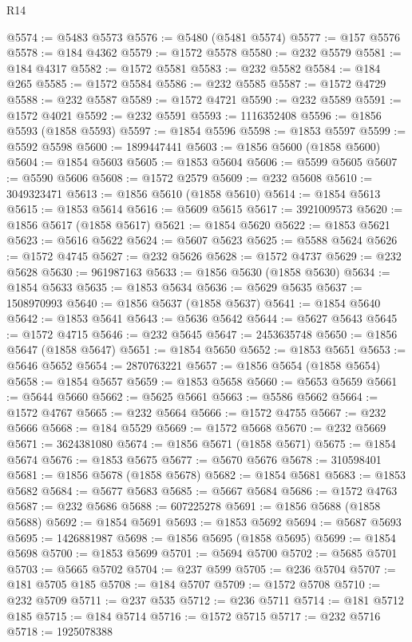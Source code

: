 \begin{lexlean}{R14}
\begin{coremodule}
@5574 := @5483 @5573
@5576 := @5480 (@5481 @5574)
@5577 := @157 @5576
@5578 := @184 @4362
@5579 := @1572 @5578
@5580 := @232 @5579
@5581 := @184 @4317
@5582 := @1572 @5581
@5583 := @232 @5582
@5584 := @184 @265
@5585 := @1572 @5584
@5586 := @232 @5585
@5587 := @1572 @4729
@5588 := @232 @5587
@5589 := @1572 @4721
@5590 := @232 @5589
@5591 := @1572 @4021
@5592 := @232 @5591
@5593 := 1116352408
@5596 := @1856 @5593 (@1858 @5593)
@5597 := @1854 @5596
@5598 := @1853 @5597
@5599 := @5592 @5598
@5600 := 1899447441
@5603 := @1856 @5600 (@1858 @5600)
@5604 := @1854 @5603
@5605 := @1853 @5604
@5606 := @5599 @5605
@5607 := @5590 @5606
@5608 := @1572 @2579
@5609 := @232 @5608
@5610 := 3049323471
@5613 := @1856 @5610 (@1858 @5610)
@5614 := @1854 @5613
@5615 := @1853 @5614
@5616 := @5609 @5615
@5617 := 3921009573
@5620 := @1856 @5617 (@1858 @5617)
@5621 := @1854 @5620
@5622 := @1853 @5621
@5623 := @5616 @5622
@5624 := @5607 @5623
@5625 := @5588 @5624
@5626 := @1572 @4745
@5627 := @232 @5626
@5628 := @1572 @4737
@5629 := @232 @5628
@5630 := 961987163
@5633 := @1856 @5630 (@1858 @5630)
@5634 := @1854 @5633
@5635 := @1853 @5634
@5636 := @5629 @5635
@5637 := 1508970993
@5640 := @1856 @5637 (@1858 @5637)
@5641 := @1854 @5640
@5642 := @1853 @5641
@5643 := @5636 @5642
@5644 := @5627 @5643
@5645 := @1572 @4715
@5646 := @232 @5645
@5647 := 2453635748
@5650 := @1856 @5647 (@1858 @5647)
@5651 := @1854 @5650
@5652 := @1853 @5651
@5653 := @5646 @5652
@5654 := 2870763221
@5657 := @1856 @5654 (@1858 @5654)
@5658 := @1854 @5657
@5659 := @1853 @5658
@5660 := @5653 @5659
@5661 := @5644 @5660
@5662 := @5625 @5661
@5663 := @5586 @5662
@5664 := @1572 @4767
@5665 := @232 @5664
@5666 := @1572 @4755
@5667 := @232 @5666
@5668 := @184 @5529
@5669 := @1572 @5668
@5670 := @232 @5669
@5671 := 3624381080
@5674 := @1856 @5671 (@1858 @5671)
@5675 := @1854 @5674
@5676 := @1853 @5675
@5677 := @5670 @5676
@5678 := 310598401
@5681 := @1856 @5678 (@1858 @5678)
@5682 := @1854 @5681
@5683 := @1853 @5682
@5684 := @5677 @5683
@5685 := @5667 @5684
@5686 := @1572 @4763
@5687 := @232 @5686
@5688 := 607225278
@5691 := @1856 @5688 (@1858 @5688)
@5692 := @1854 @5691
@5693 := @1853 @5692
@5694 := @5687 @5693
@5695 := 1426881987
@5698 := @1856 @5695 (@1858 @5695)
@5699 := @1854 @5698
@5700 := @1853 @5699
@5701 := @5694 @5700
@5702 := @5685 @5701
@5703 := @5665 @5702
@5704 := @237 @599
@5705 := @236 @5704
@5707 := @181 @5705 @185
@5708 := @184 @5707
@5709 := @1572 @5708
@5710 := @232 @5709
@5711 := @237 @535
@5712 := @236 @5711
@5714 := @181 @5712 @185
@5715 := @184 @5714
@5716 := @1572 @5715
@5717 := @232 @5716
@5718 := 1925078388

\end{coremodule}
\end{lexlean}
